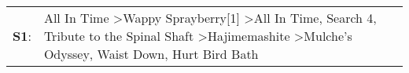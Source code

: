 \begin{supertabular}{p{0.03\textwidth}p{0.92\textwidth}}
 \textbf{S1}:  &  All In Time\textsuperscript{} \textgreater \enspace Wappy Sprayberry[1]\textsuperscript{} \textgreater \enspace All In Time\textsuperscript{}, \enspace Search 4\textsuperscript{}, \enspace Tribute to the Spinal Shaft\textsuperscript{} \textgreater \enspace Hajimemashite\textsuperscript{} \textgreater \enspace Mulche's Odyssey\textsuperscript{}, \enspace Waist Down\textsuperscript{}, \enspace Hurt Bird Bath\textsuperscript{}  \enspace  \\
\end{supertabular}
